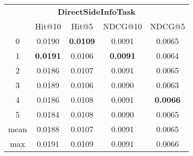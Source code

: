 \documentclass{article}
\begin{document}
 

\begin{tabular}{c|cccc}

\multicolumn{5}{c}{\textbf{DirectSideInfoTask}} \\
\noalign{\smallskip}
\noalign{\smallskip}
\toprule
\multicolumn{1}{c}{Template ID}	&	\multicolumn{1}{|c}{Hit@10}	&	\multicolumn{1}{c}{Hit@5}	&	\multicolumn{1}{c}{NDCG@10}	&	\multicolumn{1}{c}{NDCG@5}\\
\midrule
0	&	0.0190	&	\textbf{0.0109}	&	0.0091	&	0.0065\\
1	&	\textbf{0.0191}	&	0.0106	&	\textbf{0.0091}	&	0.0064\\
2	&	0.0186	&	0.0107	&	0.0091	&	0.0065\\
3	&	0.0189	&	0.0106	&	0.0090	&	0.0063\\
4	&	0.0186	&	0.0108	&	0.0091	&	\textbf{0.0066}\\
5	&	0.0184	&	0.0108	&	0.0090	&	0.0065\\
\midrule
mean	&	0.0188	&	0.0107	&	0.0091	&	0.0065\\
max	&	0.0191	&	0.0109	&	0.0091	&	0.0066\\
\bottomrule

\end{tabular}
\end{document}
